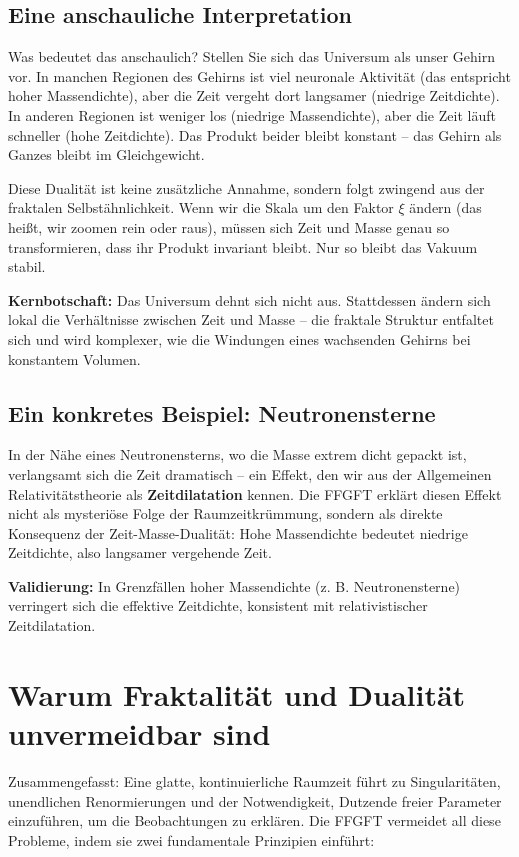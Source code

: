 \subsection{Eine anschauliche Interpretation}

Was bedeutet das anschaulich? Stellen Sie sich das Universum als unser Gehirn vor. In manchen Regionen des Gehirns ist viel neuronale Aktivität (das entspricht hoher Massendichte), aber die Zeit vergeht dort langsamer (niedrige Zeitdichte). In anderen Regionen ist weniger los (niedrige Massendichte), aber die Zeit läuft schneller (hohe Zeitdichte). Das Produkt beider bleibt konstant – das Gehirn als Ganzes bleibt im Gleichgewicht.

Diese Dualität ist keine zusätzliche Annahme, sondern folgt zwingend aus der fraktalen Selbstähnlichkeit. Wenn wir die Skala um den Faktor $\xi$ ändern (das heißt, wir zoomen rein oder raus), müssen sich Zeit und Masse genau so transformieren, dass ihr Produkt invariant bleibt. Nur so bleibt das Vakuum stabil.

\textbf{Kernbotschaft:} Das Universum dehnt sich nicht aus. Stattdessen ändern sich lokal die Verhältnisse zwischen Zeit und Masse – die fraktale Struktur entfaltet sich und wird komplexer, wie die Windungen eines wachsenden Gehirns bei konstantem Volumen.

\subsection{Ein konkretes Beispiel: Neutronensterne}

In der Nähe eines Neutronensterns, wo die Masse extrem dicht gepackt ist, verlangsamt sich die Zeit dramatisch – ein Effekt, den wir aus der Allgemeinen Relativitätstheorie als \textbf{Zeitdilatation} kennen. Die FFGFT erklärt diesen Effekt nicht als mysteriöse Folge der Raumzeitkrümmung, sondern als direkte Konsequenz der Zeit-Masse-Dualität: Hohe Massendichte bedeutet niedrige Zeitdichte, also langsamer vergehende Zeit.

\textbf{Validierung:} In Grenzfällen hoher Massendichte (z. B. Neutronensterne) verringert sich die effektive Zeitdichte, konsistent mit relativistischer Zeitdilatation.

\section{Warum Fraktalität und Dualität unvermeidbar sind}

Zusammengefasst: Eine glatte, kontinuierliche Raumzeit führt zu Singularitäten, unendlichen Renormierungen und der Notwendigkeit, Dutzende freier Parameter einzuführen, um die Beobachtungen zu erklären. Die FFGFT vermeidet all diese Probleme, indem sie zwei fundamentale Prinzipien einführt:

